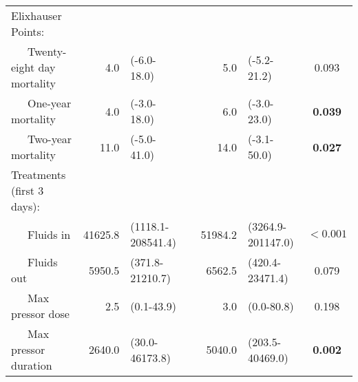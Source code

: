 {\begin{tabular}{l r l c r l c}
Elixhauser Points: & & & & & & \\ 
~~~Twenty-eight day mortality & 4.0 & (-6.0-18.0) & & 5.0 & (-5.2-21.2) & 0.093 \\ 
~~~One-year mortality & 4.0 & (-3.0-18.0) & & 6.0 & (-3.0-23.0) & \textbf{0.039} \\ 
~~~Two-year mortality & 11.0 & (-5.0-41.0) & & 14.0 & (-3.1-50.0) & \textbf{0.027} \\ 
Treatments (first 3 days): & & & & & & \\ 
~~~Fluids in & 41625.8 & (1118.1-208541.4) & & 51984.2 & (3264.9-201147.0) & $\mathbf{<0.001}$ \\ 
~~~Fluids out & 5950.5 & (371.8-21210.7) & & 6562.5 & (420.4-23471.4) & 0.079 \\ 
~~~Max pressor dose & 2.5 & (0.1-43.9) & & 3.0 & (0.0-80.8) & 0.198 \\ 
~~~Max pressor duration & 2640.0 & (30.0-46173.8) & & 5040.0 & (203.5-40469.0) & \textbf{0.002} \\ 
\bottomrule
\end{tabular}
}
